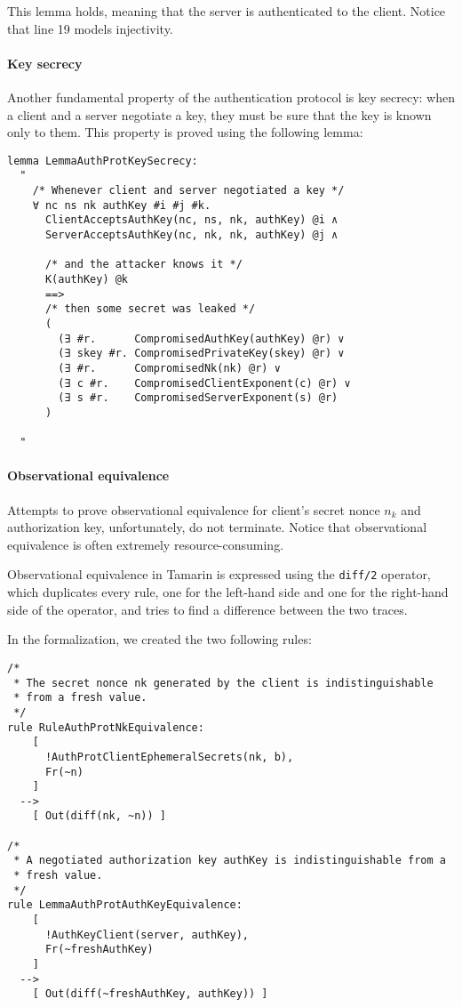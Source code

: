 This lemma holds, meaning that the server is authenticated to the client. Notice that line 19 models injectivity.

\paragraph{Key secrecy}
Another fundamental property of the authentication protocol is key secrecy: when a client and a server negotiate a key, they must be sure that the key is known only to them. This property is proved using the following lemma:
\begin{lstlisting}
lemma LemmaAuthProtKeySecrecy:
  "
    /* Whenever client and server negotiated a key */
    ∀ nc ns nk authKey #i #j #k.
      ClientAcceptsAuthKey(nc, ns, nk, authKey) @i ∧
      ServerAcceptsAuthKey(nc, nk, nk, authKey) @j ∧

      /* and the attacker knows it */
      K(authKey) @k
      ==>
      /* then some secret was leaked */
      (
        (∃ #r.      CompromisedAuthKey(authKey) @r) ∨
        (∃ skey #r. CompromisedPrivateKey(skey) @r) ∨
        (∃ #r.      CompromisedNk(nk) @r) ∨
        (∃ c #r.    CompromisedClientExponent(c) @r) ∨
        (∃ s #r.    CompromisedServerExponent(s) @r)
      )

  "
\end{lstlisting}

\paragraph{Observational equivalence}
Attempts to prove observational equivalence for client's secret nonce $n_k$ and authorization key, unfortunately, do not terminate. Notice that observational equivalence is often extremely resource-consuming.

Observational equivalence in Tamarin is expressed using the \lstinline{diff/2} operator, which duplicates every rule, one for the left-hand side and one for the right-hand side of the operator, and tries to find a difference between the two traces.

In the formalization, we created the two following rules:

\newpage

\begin{lstlisting}
/*
 * The secret nonce nk generated by the client is indistinguishable 
 * from a fresh value.
 */
rule RuleAuthProtNkEquivalence:
    [
      !AuthProtClientEphemeralSecrets(nk, b),
      Fr(~n)
    ]
  -->
    [ Out(diff(nk, ~n)) ]

/*
 * A negotiated authorization key authKey is indistinguishable from a 
 * fresh value.
 */
rule LemmaAuthProtAuthKeyEquivalence:
    [
      !AuthKeyClient(server, authKey),
      Fr(~freshAuthKey)
    ]
  -->
    [ Out(diff(~freshAuthKey, authKey)) ]
\end{lstlisting}





